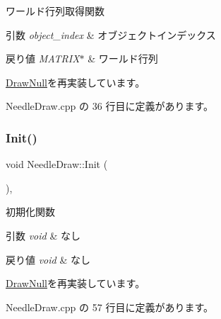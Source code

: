 ワールド行列取得関数 


\begin{DoxyParams}{引数}
{\em object\+\_\+index} & オブジェクトインデックス \\
\hline
\end{DoxyParams}

\begin{DoxyRetVals}{戻り値}
{\em M\+A\+T\+R\+I\+X$\ast$} & ワールド行列 \\
\hline
\end{DoxyRetVals}


\mbox{\hyperlink{class_draw_null_a9aac059eb3b5d1f77e8bd3aa0647cff9}{Draw\+Null}}を再実装しています。



 Needle\+Draw.\+cpp の 36 行目に定義があります。

\mbox{\label{class_needle_draw_a8b170b4ed205bba8ca991a4dc7779844}} 
\subsubsection{\texorpdfstring{Init()}{Init()}}
{\footnotesize\ttfamily void Needle\+Draw\+::\+Init (\begin{DoxyParamCaption}{ }\end{DoxyParamCaption})\hspace{0.3cm}{\ttfamily [override]}, {\ttfamily [virtual]}}



初期化関数 


\begin{DoxyParams}{引数}
{\em void} & なし \\
\hline
\end{DoxyParams}

\begin{DoxyRetVals}{戻り値}
{\em void} & なし \\
\hline
\end{DoxyRetVals}


\mbox{\hyperlink{class_draw_null_a20aef1e54c1a158b741bfd731e18efdf}{Draw\+Null}}を再実装しています。



 Needle\+Draw.\+cpp の 57 行目に定義があります。

\mbox{\label{class_needle_draw_ad831a9aba09ad3932832a23301bd6143}} 
